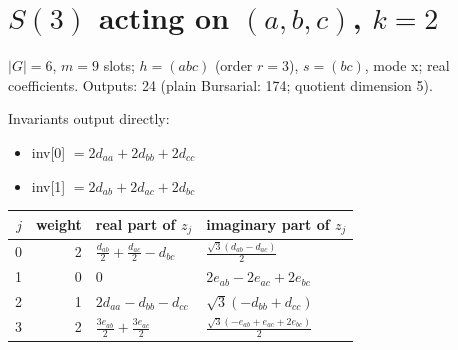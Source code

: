 \documentclass[10pt]{article}
\begin{document}
\clearpage
\section{$S(3)$ acting on $(a, b, c)$, $k = 2$}
$|G| = 6$, $m = 9$ slots; $h = (a b c)$ (order $r = 3$), $s = (b c)$, mode x; real coefficients. Outputs: 24 (plain Bursarial: 174; quotient dimension 5).

Invariants output directly:
\begin{itemize}
  \item inv[0] $= 2 d_{aa} + 2 d_{bb} + 2 d_{cc}$
  \item inv[1] $= 2 d_{ab} + 2 d_{ac} + 2 d_{bc}$
\end{itemize}

\begin{longtable}{rr>{\raggedright\arraybackslash}p{}>{\raggedright\arraybackslash}p{}}
$j$ & weight & real part of $z_j$ & imaginary part of $z_j$ \\ \hline
0 & 2 & $\frac{d_{ab}}{2} + \frac{d_{ac}}{2} - d_{bc}$ & $\frac{\sqrt{3} \left(d_{ab} - d_{ac}\right)}{2}$ \\
1 & 0 & $0$ & $2 e_{ab} - 2 e_{ac} + 2 e_{bc}$ \\
2 & 1 & $2 d_{aa} - d_{bb} - d_{cc}$ & $\sqrt{3} \left(- d_{bb} + d_{cc}\right)$ \\
3 & 2 & $\frac{3 e_{ab}}{2} + \frac{3 e_{ac}}{2}$ & $\frac{\sqrt{3} \left(- e_{ab} + e_{ac} + 2 e_{bc}\right)}{2}$ \\
\end{longtable}
\end{document}
